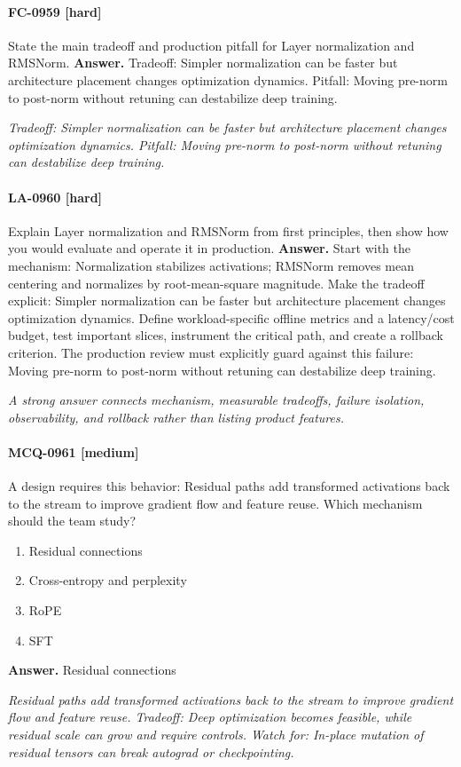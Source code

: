 \paragraph{FC-0959 [hard]} State the main tradeoff and production pitfall for Layer normalization and RMSNorm.
\noindent\textbf{Answer.} Tradeoff: Simpler normalization can be faster but architecture placement changes optimization dynamics. Pitfall: Moving pre-norm to post-norm without retuning can destabilize deep training.
\par\textit{Tradeoff: Simpler normalization can be faster but architecture placement changes optimization dynamics. Pitfall: Moving pre-norm to post-norm without retuning can destabilize deep training.}
\paragraph{LA-0960 [hard]} Explain Layer normalization and RMSNorm from first principles, then show how you would evaluate and operate it in production.
\noindent\textbf{Answer.} Start with the mechanism: Normalization stabilizes activations; RMSNorm removes mean centering and normalizes by root-mean-square magnitude. Make the tradeoff explicit: Simpler normalization can be faster but architecture placement changes optimization dynamics. Define workload-specific offline metrics and a latency/cost budget, test important slices, instrument the critical path, and create a rollback criterion. The production review must explicitly guard against this failure: Moving pre-norm to post-norm without retuning can destabilize deep training.
\par\textit{A strong answer connects mechanism, measurable tradeoffs, failure isolation, observability, and rollback rather than listing product features.}
\paragraph{MCQ-0961 [medium]} A design requires this behavior: Residual paths add transformed activations back to the stream to improve gradient flow and feature reuse. Which mechanism should the team study?
\begin{enumerate}[label=\Alph*.]
\item Residual connections
\item Cross-entropy and perplexity
\item RoPE
\item SFT
\end{enumerate}
\noindent\textbf{Answer.} Residual connections
\par\textit{Residual paths add transformed activations back to the stream to improve gradient flow and feature reuse. Tradeoff: Deep optimization becomes feasible, while residual scale can grow and require controls. Watch for: In-place mutation of residual tensors can break autograd or checkpointing.}
